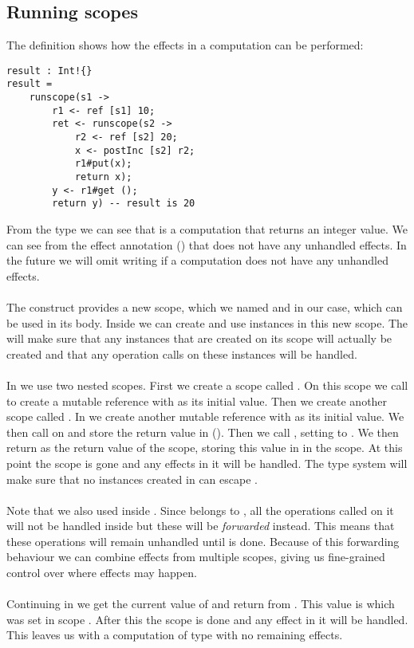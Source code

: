 \subsection{Running scopes}
The definition  shows how the effects in a computation can be performed:

\begin{verbatim}
result : Int!{}
result =
	runscope(s1 ->
		r1 <- ref [s1] 10;
		ret <- runscope(s2 ->
			r2 <- ref [s2] 20;
			x <- postInc [s2] r2;
			r1#put(x);
			return x);
		y <- r1#get ();
		return y) -- result is 20
\end{verbatim}

From the type we can see that  is a computation that returns an integer value.
We can see from the effect annotation (\ident{!{}}) that  does not have any unhandled effects.
In the future we will omit writing \ident{!{}} if a computation does not have any unhandled effects.
\\\\
The  construct provides a new scope, which we named  and  in our case, which can be used in its body.
Inside  we can create and use instances in this new scope.
The  will make sure that any instances that are created on its scope will actually be created and that any operation calls on these instances will be handled.
\\\\
In  we use two nested scopes.
First we create a scope called .
On this scope we call  to create a mutable reference  with  as its initial value.
Then we create another scope called .
In  we create another mutable reference  with  as its initial value.
We then call  on  and store the return value in  ().
Then we call , setting  to .
We then return  as the return value of the  scope, storing this value in  in the  scope.
At this point the  scope is gone and any effects in it will be handled.
The type system will make sure that no instances created in  can escape .
\\\\
Note that we also used  inside .
Since  belongs to , all the operations called on it will not be handled inside  but these will be \emph{forwarded} instead.
This means that these operations will remain unhandled until  is done.
Because of this forwarding behaviour we can combine effects from multiple scopes, giving us fine-grained control over where effects may happen.
\\\\
Continuing in  we get the current value of  and return from .
This value is  which was set in scope .
After this the scope  is done and any effect in it will be handled.
This leaves us with a computation of type  with no remaining effects.

